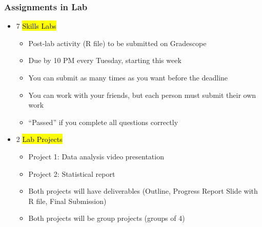 \documentclass[slidestop,compress,mathserif]{beamer}
\begin{document}
\begin{frame}
	\frametitle{Assignments in Lab}
	\begin{itemize}
		\item 7 \hl{Skills Labs}
			\begin{itemize}
				\item Post-lab activity (R file) to be submitted on Gradescope
				\item Due by 10 PM every Tuesday, starting this week
				\item You can submit as many times as you want before the deadline
				\item You can work with your friends, but each person must submit their own work
				\item ``Passed'' if you complete all questions correctly
			\end{itemize}
		\item 2 \hl{Lab Projects}	
			\begin{itemize}
				\item Project 1: Data analysis video presentation
				\item Project 2: Statistical report
				\item Both projects will have deliverables (Outline, Progress Report Slide with R file, Final Submission)
				\item Both projects will be group projects (groups of 4)
			\end{itemize}
	\end{itemize}
\end{frame}
\end{document}
